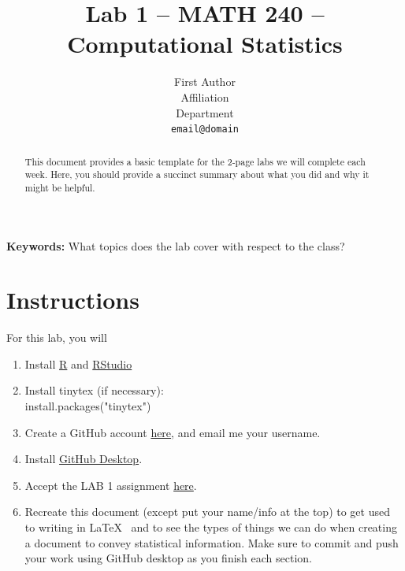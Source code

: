 \documentclass{article}\usepackage[]{graphicx}\usepackage[]{xcolor}
\begin{document}
\vspace{-1in}
\title{Lab 1 -- MATH 240 -- Computational Statistics}

\author{
  First Author \\
  Affiliation  \\
  Department  \\
  {\tt email@domain}
}

\date{}

\maketitle

\begin{multicols}{2}
\begin{abstract}
This document provides a basic template for the 2-page labs we will complete each week. Here, you should provide a succinct summary about what you did and why it might be helpful. 
\end{abstract}

\noindent \textbf{Keywords:} What topics does the lab cover with respect to the class?

\section{Instructions}
For this lab, you will \\ 


\begin{enumerate}
  \item Install \href{https://cran.rstudio.com}{R} and \href{https://posit.co/download/rstudio-desktop}{RStudio} 
  \item Install tinytex (if necessary): \\ install.packages("tinytex")
  \item Create a GitHub account \href{https://github.com}{here}, and email me your username.
  \item Install \href{https://github.com}{GitHub Desktop}.
  \item Accept the LAB 1 assignment \href{https://classroom.github.com/a/gfC_xMMl}{here}.
  \item Recreate this document (except put your name/info at the top) to get used to writing in \LaTeX~  and to see the types of things we can do when creating a document to convey statistical information. Make sure to commit and push your work using GitHub desktop as you finish each section.
\end{enumerate}


\end{multicols}
\end{document}
